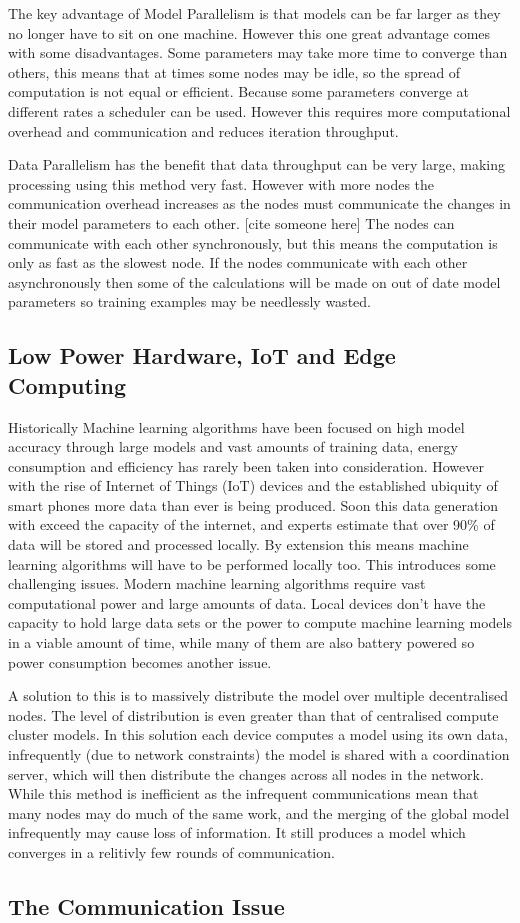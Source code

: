 The key advantage of Model Parallelism is that models can be far larger as they
no longer have to sit on one machine. However this one great advantage comes
with some disadvantages. Some parameters may take more time to converge than
others, this means that at times some nodes may be idle, so the spread of
computation is not equal or efficient. \cite{Dean2012Distbelief} Because some
parameters converge at different rates a scheduler can be used. However this
requires more computational overhead and communication and reduces iteration
throughput. \cite{kim2016STRADS}

Data Parallelism has the benefit that data throughput can be very large, making
processing using this method very fast. However with more nodes the
communication overhead increases as the nodes must communicate the changes in
their model parameters to each other. [cite someone here] The nodes can
communicate with each other synchronously, but this means the computation is
only as fast as the slowest node. If the nodes communicate with each other
asynchronously then some of the calculations will be made on out of date model
parameters so training examples may be needlessly wasted.

\subsection{Low Power Hardware, IoT and Edge Computing}

Historically Machine learning algorithms have been focused on high model
accuracy through large models and vast amounts of training data, energy
consumption and efficiency has rarely been taken into consideration. However
with the rise of Internet of Things (IoT) devices and the established ubiquity
of smart phones more data than ever is being produced. Soon this data generation
with exceed the capacity of the internet, and experts estimate that over 90\% of
data will be stored and processed locally. \cite{Chaing2016FogIoT} By extension
this means machine learning algorithms will have to be performed locally too.
This introduces some challenging issues. Modern machine learning algorithms
require vast computational power and large amounts of data. Local devices don't
have the capacity to hold large data sets or the power to compute machine
learning models in a viable amount of time, while many of them are also battery
powered so power consumption becomes another issue.

A solution to this is to massively distribute the model over multiple
decentralised nodes. The level of distribution is even greater than that of
centralised compute cluster models. In this solution each device computes a
model using its own data, infrequently (due to network constraints) the model is
shared with a coordination server, which will then distribute the changes across
all nodes in the network. \cite{wang2018EdgeLearning} While this method is
inefficient as the infrequent communications mean that many nodes may do much of
the same work, and the merging of the global model infrequently may cause loss
of information. It still produces a model which converges in a relitivly few
rounds of communication. \cite{konevcny2016federated}




\subsection{The Communication Issue}